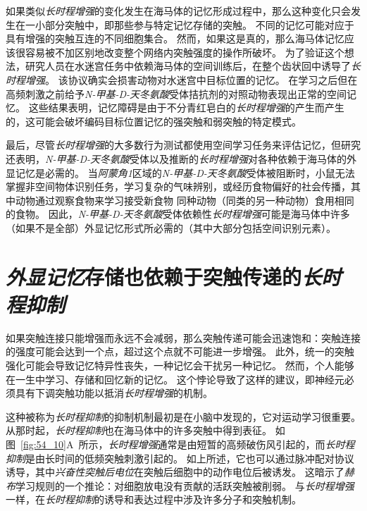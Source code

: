 如果类似\textit{长时程增强}的变化发生在海马体的记忆形成过程中，那么这种变化只会发生在一小部分突触中，即那些参与特定记忆存储的突触。
不同的记忆可能对应于具有增强的突触互连的不同细胞集合。
然而，如果这是真的，那么海马体记忆应该很容易被不加区别地改变整个网络内突触强度的操作所破坏。
为了验证这个想法，研究人员在水迷宫任务中依赖海马体的空间训练后，在整个齿状回中诱导了\textit{长时程增强}。
该协议确实会损害动物对水迷宫中目标位置的记忆。
在学习之后但在高频刺激之前给予\textit{N-甲基-D-天冬氨酸}受体拮抗剂的对照动物表现出正常的空间记忆。
这些结果表明，记忆障碍是由于不分青红皂白的\textit{长时程增强}的产生而产生的，这可能会破坏编码目标位置记忆的强突触和弱突触的特定模式。


最后，尽管\textit{长时程增强}的大多数行为测试都使用空间学习任务来评估记忆，但研究还表明，\textit{N-甲基-D-天冬氨酸}受体以及推断的\textit{长时程增强}对各种依赖于海马体的外显记忆是必需的。
当\textit{阿蒙角1}区域的\textit{N-甲基-D-天冬氨酸}受体被阻断时，小鼠无法掌握非空间物体识别任务，学习复杂的气味辨别，或经历食物偏好的社会传播，其中动物通过观察食物来学习接受新食物 同种动物（同类的另一种动物）食用相同的食物。
因此，\textit{N-甲基-D-天冬氨酸}受体依赖性\textit{长时程增强}可能是海马体中许多（如果不是全部）外显记忆形式所必需的（其中大部分包括空间识别元素）。



\section{\textit{外显记忆}存储也依赖于突触传递的\textit{长时程抑制}}

如果突触连接只能增强而永远不会减弱，那么突触传递可能会迅速饱和：突触连接的强度可能会达到一个点，超过这个点就不可能进一步增强。
此外，统一的突触强化可能会导致记忆特异性丧失，一种记忆会干扰另一种记忆。
然而，个人能够在一生中学习、存储和回忆新的记忆。
这个悖论导致了这样的建议，即神经元必须具有下调突触功能以抵消\textit{长时程增强}的机制。


这种被称为\textit{长时程抑制}的抑制机制最初是在小脑中发现的，它对运动学习很重要。
从那时起，\textit{长时程抑制}也在海马体中的许多突触中得到表征。
如图~\ref{fig:54_10}A~所示，\textit{长时程增强}通常是由短暂的高频破伤风引起的，而\textit{长时程抑制}是由长时间的低频突触刺激引起的。
如上所述，它也可以通过脉冲配对协议诱导，其中\textit{兴奋性突触后电位}在突触后细胞中的动作电位后被诱发。
这暗示了\textit{赫布}学习规则的一个推论：对细胞放电没有贡献的活跃突触被削弱。
与\textit{长时程增强}一样，在\textit{长时程抑制}的诱导和表达过程中涉及许多分子和突触机制。


